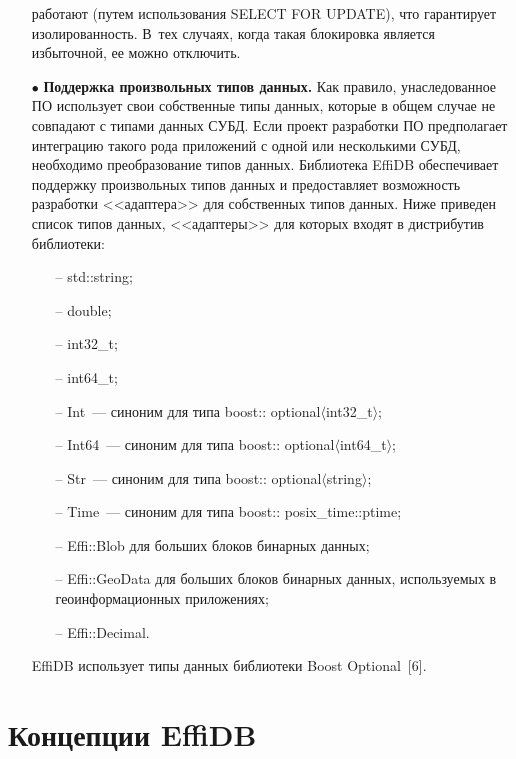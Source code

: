 \begin{multicols}{2}
\begin{itemize}
работают (путем использования\linebreak
 SELECT FOR UPDATE), что гарантирует 
изолированность. В~тех случаях, когда такая блокировка является избыточной, ее 
можно отключить.
\item[$\bullet$] \textbf{Поддержка произвольных типов данных.} Как правило, 
унаследованное ПО использует свои собственные типы данных, 
которые в общем случае не совпадают с типами данных СУБД. Если проект 
разработки ПО предполагает интеграцию такого рода 
приложений с одной или несколькими СУБД, необходимо преобразование типов 
данных. Библиотека \mbox{EffiDB} 
обеспечивает поддержку произвольных типов данных и пред\-остав\-ля\-ет 
возможность разработки <<адап\-те\-ра>> для собственных типов данных. Ниже 
приведен список типов данных, <<адап\-те\-ры>> для которых входят в дистрибутив 
библиотеки:
\begin{itemize}
\item[--] {\sf std::string};
\item[--] {\sf double};
\item[--] {\sf int32\_t};
\item[--] {\sf int64\_t};
\item[--] {\sf Int}~--- синоним для типа {\sf boost:: optional$\langle$int32\_t$\rangle$};
\item[--] {\sf Int64}~--- синоним для типа {\sf boost:: optional$\langle$int64\_t$\rangle$};
\item[--] {\sf Str}~--- синоним для типа {\sf boost:: optional$\langle$string$\rangle$};
\item[--] {\sf Time}~--- синоним для типа {\sf boost:: posix\_time::ptime};
\item[--] {\sf Effi::Blob} для больших блоков бинарных данных;
\item[--] {\sf Effi::GeoData} для больших блоков бинарных данных, используемых в 
геоинформационных приложениях;
\item[--] {\sf Effi::Decimal}.
\end{itemize}
EffiDB использует типы данных библиотеки Boost Optional~[6].
\end{itemize}

\vspace*{-9pt}

\section{Концепции EffiDB}

\vspace*{-2pt}


\end{multicols}

